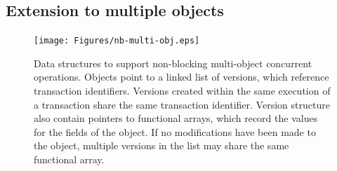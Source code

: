 \subsection{Extension to multiple objects}
\begin{figure}[t]\centering
\texttt{[image: Figures/nb-multi-obj.eps]}
\caption[Data structures to support non-blocking multi-object
  concurrent operations.]{Data structures to support non-blocking multi-object
  concurrent operations.  Objects point to a linked list of versions,
  which reference transaction identifiers.  Versions created within the
  same execution of a transaction share the same transaction
  identifier.  Version structure also contain pointers to functional
  arrays, which record the values for the fields of the object.
  If no modifications have been made to the object, multiple versions
  in the list may share the same functional array.}
\label{fig:multi-o}
\end{figure}
